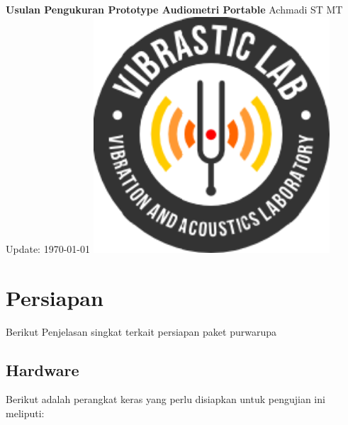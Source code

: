 \documentclass[12pt]{book}
\date{}
\begin{document}
    \frontmatter
	\begin{titlepage}
		\centering
		{\LARGE \bf Usulan Pengukuran Prototype Audiometri Portable}
		\vfill
		{\Large Achmadi ST MT}
		\vfill
		Update: {\today}
		\vfill
		\includegraphics[width=250pt]{images/logo/logoviblab}
		\vfill
		\vfill
		\vfill
	\end{titlepage}


	\newpage
	\tableofcontents
	\listoffigures
	\listoftables


	\newpage
	\tableofcontents


    \mainmatter
    \newpage

	\chapter{Persiapan}

    Berikut Penjelasan singkat terkait persiapan paket purwarupa

	\section{Hardware}

    Berikut adalah perangkat keras yang perlu disiapkan untuk pengujian ini meliputi:
\end{document}
